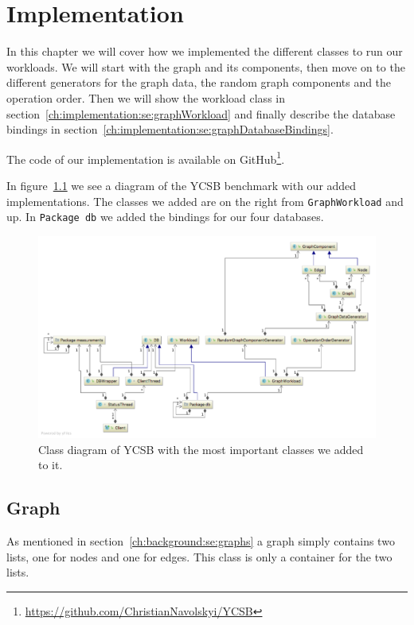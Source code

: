 \chapter{Implementation}
\label{ch:implementation}
In this chapter we will cover how we implemented the different classes to run our workloads.
We will start with the graph and its components,
then move on to the different generators for the graph data,
the random graph components and the operation order.
Then we will show the workload class in section~\ref{ch:implementation:se:graphWorkload} and finally describe the database bindings in section~\ref{ch:implementation:se:graphDatabaseBindings}.

The code of our implementation is available on GitHub\footnote{\url{https://github.com/ChristianNavolskyi/YCSB}}.

In figure~\ref{fig:YCSBExtension} we see a diagram of the YCSB benchmark with our added implementations.
The classes we added are on the right from \texttt{GraphWorkload} and up.
In \texttt{Package db} we added the bindings for our four databases.

\begin{figure}
  \includegraphics[angle=90,height=\textheight]{images/benchmarks/extendedYCSBWorkflow}
  \caption{Class diagram of YCSB with the most important classes we added to it.}
  \label{fig:YCSBExtension}
\end{figure}

\section{Graph}
As mentioned in section~\ref{ch:background:se:graphs} a graph simply contains two lists,
one for nodes and one for edges.
This class is only a container for the two lists.

